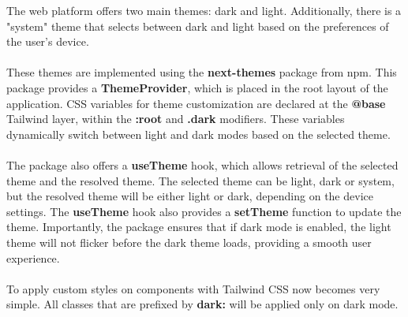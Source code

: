 \noindent The web platform offers two main themes: dark and light. Additionally, there is a "system" theme that selects between dark and light based on the preferences of the user's device.
\\\\
\noindent These themes are implemented using the \textbf{next-themes} package from npm. This package provides a \textbf{ThemeProvider}, which is placed in the root layout of the application. CSS variables for theme customization are declared at the \textbf{@base} Tailwind layer, within the \textbf{:root} and \textbf{.dark} modifiers. These variables dynamically switch between light and dark modes based on the selected theme.
\\\\
\noindent The package also offers a \textbf{useTheme} hook, which allows retrieval of the selected theme and the resolved theme. The selected theme can be light, dark or system, but the resolved theme will be either light or dark, depending on the device settings. The \textbf{useTheme} hook also provides a \textbf{setTheme} function to update the theme. Importantly, the package ensures that if dark mode is enabled, the light theme will not flicker before the dark theme loads, providing a smooth user experience.
\\\\
\noindent To apply custom styles on components with Tailwind CSS now becomes very simple. All classes that are prefixed by \textbf{dark:} will be applied only on dark mode.
\newpage

